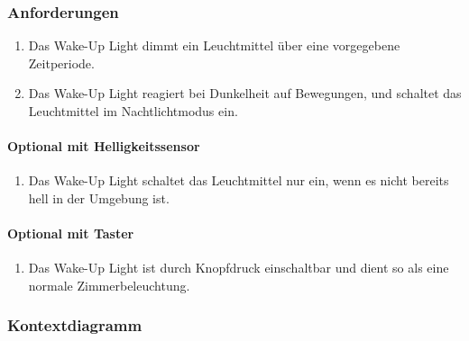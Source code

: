 \documentclass[]{article}
\providecommand{\tightlist}{%
  \setlength{\itemsep}{0pt}\setlength{\parskip}{0pt}}
\let\oldparagraph\paragraph
\renewcommand{\paragraph}[1]{\oldparagraph{#1}\mbox{}}
\begin{document}
\subsubsection{Anforderungen}\label{anforderungen}

\begin{enumerate}
\def\labelenumi{\arabic{enumi}.}
\tightlist
\item
  Das Wake-Up Light dimmt ein Leuchtmittel über eine vorgegebene
  Zeitperiode.
\item
  Das Wake-Up Light reagiert bei Dunkelheit auf Bewegungen, und schaltet
  das Leuchtmittel im Nachtlichtmodus ein.
\end{enumerate}

\paragraph{Optional mit
Helligkeitssensor}\label{optional-mit-helligkeitssensor}

\begin{enumerate}
\def\labelenumi{\arabic{enumi}.}
\setcounter{enumi}{2}
\tightlist
\item
  Das Wake-Up Light schaltet das Leuchtmittel nur ein, wenn es nicht
  bereits hell in der Umgebung ist.
\end{enumerate}

\paragraph{Optional mit Taster}\label{optional-mit-taster}

\begin{enumerate}
\def\labelenumi{\arabic{enumi}.}
\setcounter{enumi}{3}
\tightlist
\item
  Das Wake-Up Light ist durch Knopfdruck einschaltbar und dient so als
  eine normale Zimmerbeleuchtung.
\end{enumerate}

\subsubsection{Kontextdiagramm}\label{kontextdiagramm}
\end{document}
